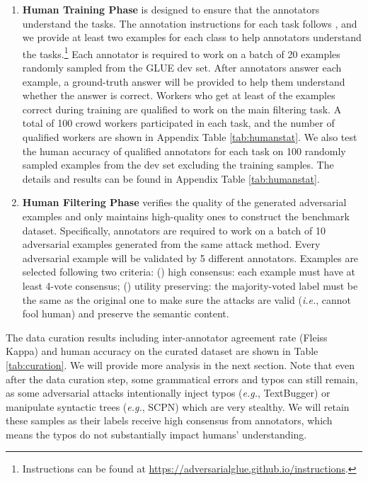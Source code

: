 \documentclass{article}
\begin{document}
\begin{enumerate}[leftmargin=*]
\item \textbf{Human Training Phase} is designed to ensure that the annotators understand the tasks. The annotation instructions for each task follows \citep{muppet}, and we provide at least two examples for each class to help annotators understand the tasks.\footnote{Instructions can be found at \url{https://adversarialglue.github.io/instructions}.} Each annotator is required to work on a batch of 20 examples randomly sampled from the GLUE dev set. After  annotators answer each example, a ground-truth answer will be provided to help them understand whether the answer is correct. Workers who get at least  of the examples correct during training are qualified to work on the main filtering task. A total of 100 crowd workers participated in each task, and the number of qualified workers are shown in Appendix Table \ref{tab:humanstat}. We also test the human accuracy of qualified annotators for each task on 100 randomly sampled examples from the dev set excluding the training samples. The details and results can be found in Appendix Table \ref{tab:humanstat}.
\item \textbf{Human Filtering Phase} verifies the quality of the generated adversarial examples and only maintains high-quality ones to construct the benchmark dataset. Specifically, annotators are required to work on a batch of 10 adversarial examples generated from the same attack method. Every adversarial example will be validated by 5 different annotators.
Examples are selected following two criteria: () high consensus: each example must have at least 4-vote consensus; () utility preserving: the majority-voted label must be the same as the original one to make sure the attacks are valid (\emph{i.e.}, cannot fool human) and preserve the semantic content. 
\end{enumerate}

The data curation results including inter-annotator agreement rate (Fleiss Kappa) and human accuracy on the curated dataset are shown in Table \ref{tab:curation}. 
We will provide more analysis in the next section.
Note that even after the data curation step, some grammatical errors and typos can still remain, as some adversarial attacks intentionally inject typos (\emph{e.g.}, TextBugger) or manipulate syntactic trees (\emph{e.g.}, SCPN) which are very stealthy. We will retain these samples as their labels receive high consensus from annotators, which means the typos do not substantially impact humans' understanding.
\end{document}
